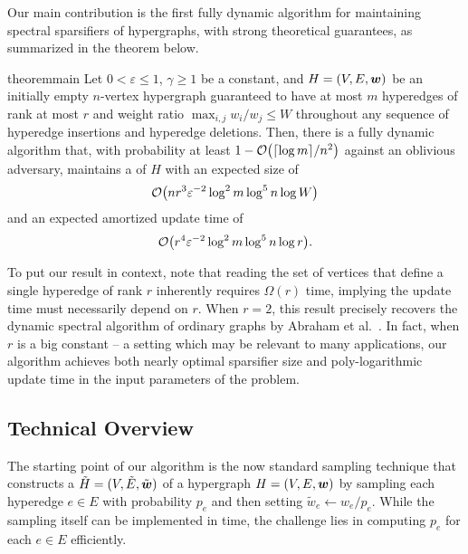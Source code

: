 Our main contribution is the first fully dynamic algorithm for maintaining spectral sparsifiers of hypergraphs, with strong theoretical guarantees, as summarized in the theorem below.



\begin{restatable}{theorem}{main}
\label{th:main}
Let \( 0 < \varepsilon \leq 1 \), 
\( \gamma \geq 1 \) be a constant, and \( { H} = (V, E, \boldsymbol{w}) \) be an initially empty \( n \)-vertex hypergraph guaranteed to have at most \( m \) hyperedges of rank 
at most \( r \) and weight ratio \( \max _{i,j} w_i / w_j \leq W \) throughout any sequence of hyperedge insertions and  hyperedge deletions.
Then, there is a fully dynamic algorithm that, with probability at least \( 1 - \atmost{ \lceil \log m \rceil /n^2} \) against an oblivious adversary, maintains a \SpectralHypersparsifier{} of \( H \) with an expected size of 
\begin{equation*}
\atmost{ n r^3 \varepsilon ^{-2} \log ^2 m \log ^5 n \log W }
\end{equation*}
and an expected amortized update time of 
\begin{equation*}
\atmost{ r^4 \varepsilon ^{-2} \log ^2 m \log ^5 n \log r }.
\end{equation*}
\end{restatable}


To put our result in context, note that reading the set of vertices that define a single hyperedge of rank $r$ inherently requires $\Omega(r)$ time, implying the update time must necessarily depend on $r$. When $r = 2$, this result precisely recovers the dynamic spectral algorithm of ordinary graphs by Abraham et al.~\cite{Abraham:2016aa}. In fact, when $r$ is a big constant -- a setting  which may be relevant to many applications, our algorithm achieves both nearly optimal sparsifier size and poly-logarithmic update time in the input parameters of the problem.












\subsection{Technical Overview}




The starting point of our algorithm is the now standard sampling technique that constructs a \SpectralHypersparsifier{} \( { \tilde H} = (V, \tilde E, \tilde{\boldsymbol{w}}) \) of a hypergraph \( { H} = (V, E, \boldsymbol{w}) \) by sampling each hyperedge \( e \in E \) with probability \( p_e \) and then setting \( \tilde w_e \gets  w_e/p_e \). 
While the sampling itself can be implemented in  time, the challenge lies in computing \( p_e \) for each \( e \in E \) efficiently. 

